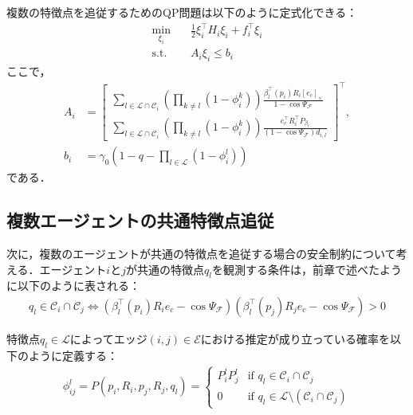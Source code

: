 複数の特徴点を追従するためのQP問題は以下のように定式化できる：
\begin{equation}
\begin{aligned}
\min_{\xi_i} \quad & \frac{1}{2}\xi_i^\top H_i \xi_i + f_i^\top \xi_i \\
\mathrm{s.t.} \quad & A_i \xi_i \leq b_i
\label{eq:multi_cbf_qp}
\end{aligned}
\end{equation}
ここで，
\begin{equation}
\begin{aligned}
A_i &= \begin{bmatrix}
\sum_{l \in \mathcal{L} \cap \mathcal{C}_i}\left(\prod_{k \neq l}(1 - \phi_i^k)\right) \frac{\beta_l^\top(p_i) R_i [e_c]_\times}{1 - \cos\Psi_{\mathcal{F}}} \\
\sum_{l \in \mathcal{L} \cap \mathcal{C}_i}\left(\prod_{k \neq l}(1 - \phi_i^k)\right) \frac{e_c^\top R_i^\top P_{\beta_l}}{(1 - \cos\Psi_{\mathcal{F}})d_{i,l}}
\end{bmatrix}^\top, \\
b_i &= \gamma_0 \left(1 - q - \prod_{l \in \mathcal{L}}(1 - \phi_i^l)\right)
\label{eq:multi_cbf_qp_params}
\end{aligned}
\end{equation}
である．

\subsection{複数エージェントの共通特徴点追従}

次に，複数のエージェントが共通の特徴点を追従する場合の安全制約について考える．エージェント$i$と$j$が共通の特徴点$q_l$を観測する条件は，前章で述べたように以下のように表される：
\begin{equation}
\begin{aligned}
q_l \in \mathcal{C}_i \cap \mathcal{C}_j \iff (\beta_l^{\top}(p_i)R_ie_c - \cos\Psi_{\mathcal{F}})(\beta_l^{\top}(p_j)R_je_c - \cos\Psi_{\mathcal{F}}) > 0
\label{eq:common_fov_condition}
\end{aligned}
\end{equation}

特徴点$q_l \in \mathcal{L}$によってエッジ$(i,j) \in \mathcal{E}$における推定が成り立っている確率を以下のように定義する：
\begin{equation}
\begin{aligned}
\phi_{ij}^l = P(p_i, R_i, p_j, R_j, q_l) = 
\begin{cases}
P_i^l P_j^l & \text{if } q_l \in \mathcal{C}_i \cap \mathcal{C}_j \\
0 & \text{if } q_l \in \mathcal{L} \setminus (\mathcal{C}_i \cap \mathcal{C}_j)
\end{cases}
\label{eq:common_probability}
\end{aligned}
\end{equation}


